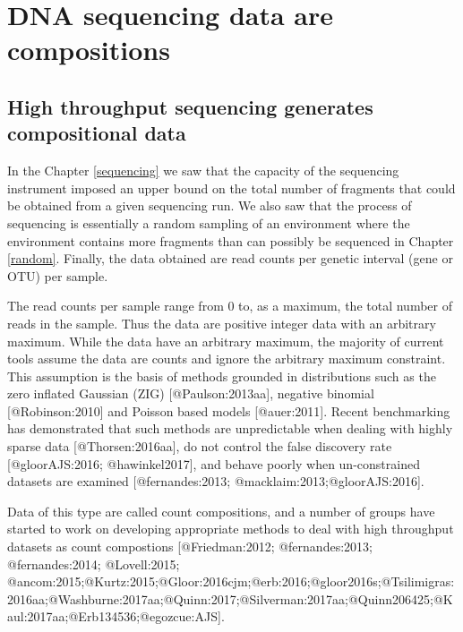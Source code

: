 \documentclass[
  onecolumn]{article}
\begin{document}
\clearpage

\hypertarget{CoDa}{%
\section{DNA sequencing data are compositions}\label{CoDa}}

\hypertarget{high-throughput-sequencing-generates-compositional-data}{%
\subsection{High throughput sequencing generates compositional data}\label{high-throughput-sequencing-generates-compositional-data}}

In the Chapter \ref{sequencing} we saw that the capacity of the sequencing instrument imposed an upper bound on the total number of fragments that could be obtained from a given sequencing run. We also saw that the process of sequencing is essentially a random sampling of an environment where the environment contains more fragments than can possibly be sequenced in Chapter \ref{random}. Finally, the data obtained are read counts per genetic interval (gene or OTU) per sample.

The read counts per sample range from 0 to, as a maximum, the total number of reads in the sample. Thus the data are positive integer data with an arbitrary maximum. While the data have an arbitrary maximum, the majority of current tools assume the data are counts and ignore the arbitrary maximum constraint. This assumption is the basis of methods grounded in distributions such as the zero inflated Gaussian (ZIG) {[}@Paulson:2013aa{]}, negative binomial {[}@Robinson:2010{]} and Poisson based models {[}@auer:2011{]}. Recent benchmarking has demonstrated that such methods are unpredictable when dealing with highly sparse data {[}@Thorsen:2016aa{]}, do not control the false discovery rate {[}@gloorAJS:2016; @hawinkel2017{]}, and behave poorly when un-constrained datasets are examined {[}@fernandes:2013; @macklaim:2013;@gloorAJS:2016{]}.

Data of this type are called count compositions, and a number of groups have started to work on developing appropriate methods to deal with high throughput datasets as count compostions {[}@Friedman:2012; @fernandes:2013; @fernandes:2014; @Lovell:2015; @ancom:2015;@Kurtz:2015;@Gloor:2016cjm;@erb:2016;@gloor2016s;@Tsilimigras:2016aa;@Washburne:2017aa;@Quinn:2017;@Silverman:2017aa;@Quinn206425;@Kaul:2017aa;@Erb134536;@egozcue:AJS{]}.
\end{document}
